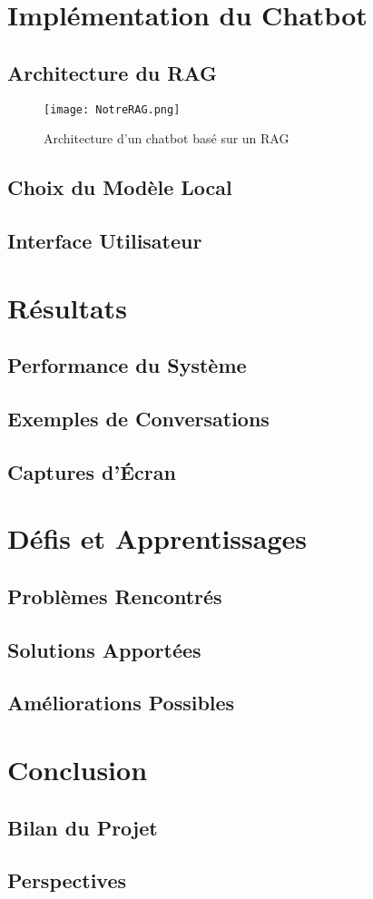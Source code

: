 \documentclass{article}
\begin{document}
\clearpage

\section{Implémentation du Chatbot}
\subsection{Architecture du RAG}
\begin{figure}[ht]
    \centering
    \texttt{[image: NotreRAG.png]}
    \caption{Architecture d’un chatbot basé sur un RAG}
\end{figure}

\subsection{Choix du Modèle Local}


\subsection{Interface Utilisateur}

\clearpage

\section{Résultats}
\subsection{Performance du Système}
\subsection{Exemples de Conversations}
\subsection{Captures d'Écran}

\clearpage

\section{Défis et Apprentissages}
\subsection{Problèmes Rencontrés}
\subsection{Solutions Apportées}
\subsection{Améliorations Possibles}

\clearpage

\section{Conclusion}
\subsection{Bilan du Projet}
\subsection{Perspectives}
\end{document}

